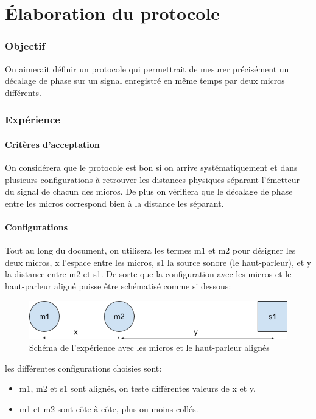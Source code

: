 \documentclass[12pt,a4paper]{report}
\author{Baptiste Lesquoy}
\begin{document}
\part{Élaboration du protocole}
\section{Objectif}
On aimerait définir un protocole qui permettrait de mesurer précisément un décalage de phase sur un signal enregistré en même temps par deux micros différents.


\section{Expérience}
\subsection{Critères d'acceptation}
On considérera que le protocole est bon si on arrive systématiquement et dans plusieurs configurations à retrouver les distances physiques séparant l'émetteur du signal de chacun des micros. De plus on vérifiera que le décalage de phase entre les micros correspond bien à la distance les séparant.

\subsection{Configurations}
Tout au long du document, on utilisera les termes m1 et m2 pour désigner les deux micros, x l'espace entre les micros, s1 la source sonore (le haut-parleur), et y la distance entre m2 et s1. De sorte que la configuration avec les micros et le haut-parleur aligné puisse être schématisé comme si dessous:
\begin{figure}[H]
\includegraphics[width=\textwidth]{../24-02-16/mesures/m1/schema.png} 
\caption{Schéma de l'expérience avec les micros et le haut-parleur alignés}
\end{figure}
les différentes configurations choisies sont:
\begin{itemize}
\item m1, m2 et s1 sont alignés, on teste différentes valeurs de x et y.
\item m1 et m2 sont côte à côte, plus ou moins collés.
\end{itemize}
\end{document}
